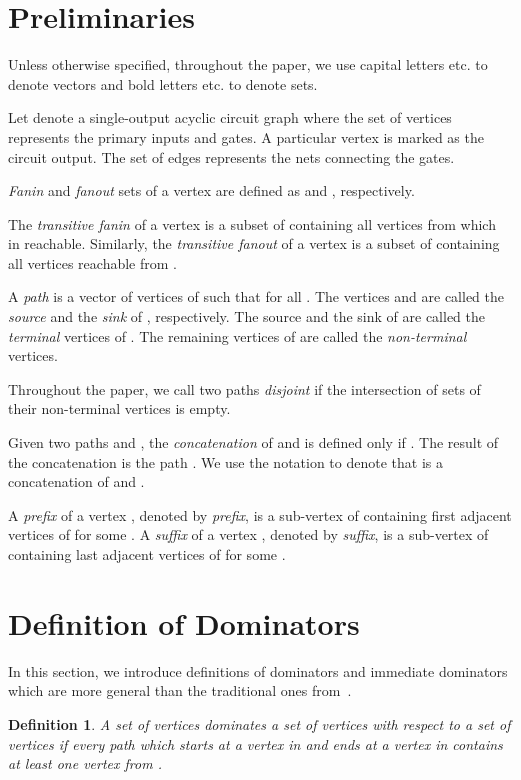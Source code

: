 \documentclass{llncs}
\newtheorem{defn}{Definition}
\begin{document}
\section{Preliminaries} \label{basic}

Unless otherwise specified, throughout the paper, we use capital letters  etc.
to denote vectors and bold letters  etc. to denote sets.

Let  denote a single-output acyclic circuit graph where the set
of vertices  represents the primary inputs and gates.  A particular
vertex  is marked as the circuit output. The set of edges
 represents the nets connecting the gates.

{\em Fanin} and {\em fanout} sets of a vertex  are defined as  and , respectively.

The {\em transitive fanin} of a vertex  is a subset of
 containing all vertices from which  in reachable.
Similarly, the {\em transitive fanout} of a vertex  is a subset of
 containing all vertices reachable from .

A {\em path}  is a vector of vertices of 
such that  for all . The
vertices  and  are called the {\em source} and the {\em
sink} of , respectively. The source and the sink of  are
called the {\em terminal} vertices of . The remaining vertices of 
 are called the {\em non-terminal} vertices. 

Throughout the paper, we call two paths {\em disjoint} if the intersection of
sets of their non-terminal vertices is empty.

Given two paths  and , the {\em concatenation} of  and 
is defined only if . The result of the
concatenation is the path .  We use the notation  to denote that 
is a concatenation of  and .

A {\em prefix} of a vertex , denoted by {\em prefix}, is a sub-vertex of 
 containing  first adjacent vertices of  for some . 
A {\em suffix} of a vertex , denoted by {\em suffix},
is a sub-vertex of  containing  last adjacent vertices of  for some . 

\section{Definition of Dominators} \label{ddom_prelim}

In this section, we introduce definitions of dominators and immediate
dominators which are more general than the traditional ones from~\cite{LeT79}.


\begin{defn} \label{ddom_dom}
A set of vertices  {\em dominates} a set of vertices  with
respect to a set of vertices  if every path which starts at a vertex
in  and ends at a vertex in  contains at least one vertex from
. 
\end{defn}
\end{document}
